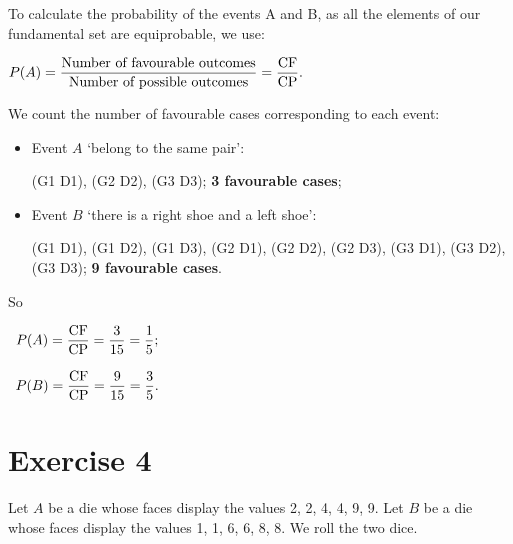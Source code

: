 \documentclass[12pt,thmsa]{article}\usepackage[]{graphicx}\usepackage[]{color}
\begin{document}
To calculate the probability of the events A and B, as all the elements of our fundamental set are equiprobable, we use:
\begin{center}$P(A)= \displaystyle \frac{\text{Number of favourable outcomes}}{\text{Number of possible outcomes}}=\frac{\rm CF}{\rm CP}.$
\end{center}
\medskip

We count the number of favourable cases corresponding to each event:
\begin{itemize}
\item Event $A$ `belong to the same pair':
\begin{center} (G1 D1), (G2 D2), (G3 D3); \textbf{3 favourable cases}; \end{center}
\item Event $B$ `there is a right shoe and a left shoe':
\begin{center}(G1 D1), (G1 D2), (G1 D3), (G2 D1), (G2 D2), (G2 D3), (G3 D1), (G3 D2),\\ (G3 D3); \textbf{9 favourable cases}.\end{center}
\end{itemize}
\medskip

So
\begin{center}
$ \begin{array}{c}
P(A)= \displaystyle \frac{\rm CF}{\rm CP}=\frac{3}{15}=\frac{1}{5};
\\
\\
P(B)=\displaystyle \frac{\rm CF}{\rm CP}=\frac{9}{15}=\frac{3}{5}.
\end{array}$
\end{center}


\section*{Exercise 4}
Let $A$ be a die whose faces display the values 2, 2, 4, 4, 9, 9.  Let $B$ be a die whose faces display the
values 1, 1, 6, 6, 8, 8. We roll the two dice.
\end{document}
